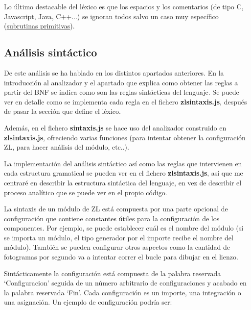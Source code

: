 \documentclass{report}
\begin{document}
	\vspace{10px}
	
	Lo último destacable del léxico es que los espacios y los comentarios (de tipo C, Javascript, Java, C++...) se ignoran todos salvo un caso muy específico (\hyperref[subrutinasprimitivas]{subrutinas primitivas}).
	
	\subsection{Análisis sintáctico}
	
	De este análisis se ha hablado en los distintos apartados anteriores. En la introducción al analizador y el apartado que explica como obtener las reglas a partir del BNF se indica como son las reglas sintácticas del lenguaje. Se puede ver en detalle como se implementa cada regla en el fichero \textbf{zlsintaxis.js}, después de pasar la sección que define el léxico. 
	
	\vspace{10px}
	
	Además, en el fichero \textbf{sintaxis.js} se hace uso del analizador construido en \textbf{zlsintaxis.js}, ofreciendo varias funciones (para intentar obtener la configuración ZL, para hacer análisis del módulo, etc..).
	
	\vspace{10px}
	
	La implementación del análisis sintáctico así como las reglas que intervienen en cada estructura gramatical se pueden ver en el fichero \textbf{zlsintaxis.js}, así que me centraré en describir la estructura sintáctica del lenguaje, en vez de describir el proceso analítico que se puede ver en el propio código.
	
	\vspace{10px}
	
	La sintaxis de un módulo de ZL está compuesta por una parte opcional de configuración que contiene constantes útiles para la configuración de los componentes. Por ejemplo, se puede establecer cuál es el nombre del módulo (si se importa un módulo, el tipo generador por el importe recibe el nombre del módulo). También se pueden configurar otros aspectos como la cantidad de fotogramas por segundo va a intentar correr el bucle para dibujar en el lienzo. 
	
	Sintácticamente la configuración está compuesta de la palabra reservada `Configuracion' seguida de un número arbitrario de configuraciones y acabado en la palabra reservada `Fin'. Cada configuración es un importe, una integración o una asignación. Un ejemplo de configuración podría ser:
	
\end{document}
